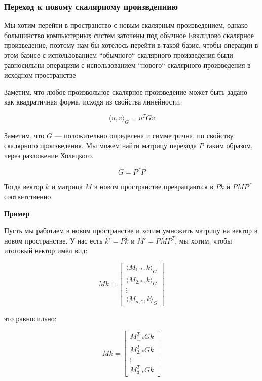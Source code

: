 \documentclass{article}
\begin{document}
    \subsubsection{Переход к новому скалярному произвдениию}

    Мы хотим перейти в пространство с новым скалярным произведением, однако большинство компьютерных систем заточены
    под обычное Евклидово скалярное произведение, поэтому нам бы хотелось перейти в такой базис, чтобы операции в этом базисе
    с использованием ``обычного`` скалярного произведения были равносильны операциям с использованием ``нового`` скалярного произведения
    в исходном пространстве

    Заметим, что любое произвольное скалярное произведение может быть задано как квадратичная форма, исходя из свойства линейности.

    \begin{equation}
        \langle u, v \rangle_{G} = u^{T} G v
    \end{equation}

    Заметим, что $G$ --- положительно определена и симметрична, по свойству скалярного произведения.
    Мы можем найти матрицу перехода $P$ таким образом, через разложение Холецкого.

    \begin{equation}
        G = P^{T} P
    \end{equation}

    Тогда вектор $k$ и матрица $M$ в новом пространстве превращаются в $Pk$ и $P M P^{T}$ соответственно

    \quad

    \textbf{Пример}

    \quad

    Пусть мы работаем в новом пространстве и хотим умножить матрицу на вектор в новом пространстве.
    У нас есть $k' = Pk$ и $M' = P M P^{T}$, мы хотим, чтобы итоговый вектор имел вид:

    \[
    Mk = \begin{bmatrix}
    \langle M_{1, *}, k \rangle_{G} \\
    \langle M_{2, *}, k \rangle_{G} \\
    \vdots \\
    \langle M_{n, *}, k \rangle_{G}
    \end{bmatrix}
    \]

    это равносильно:


    \[
    Mk = \begin{bmatrix}
    M_{1, *}^{T} G k  \\
    M_{2, *}^{T} G k  \\
    \vdots \\
    M_{3, *}^{T} G k
    \end{bmatrix}
    \]
\end{document}
